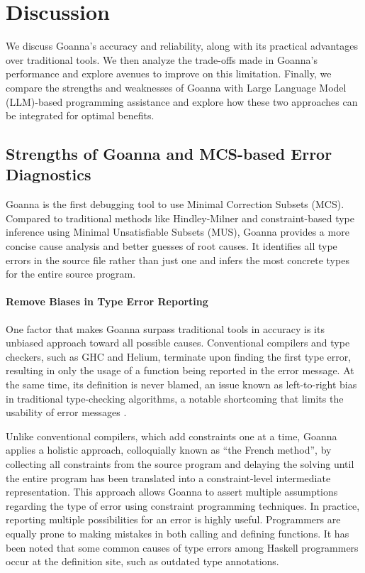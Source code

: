 \documentclass[pdflatex,lineno,sn-nature,Numbered]{sn-jnl}%
\begin{document}
\section{Discussion} \label{sec:discussion}

We discuss Goanna's accuracy and reliability, along with its practical advantages over traditional tools. We then analyze the trade-offs made in Goanna's performance and explore avenues to improve on this limitation. Finally, we compare the strengths and weaknesses of Goanna with Large Language Model (LLM)-based programming assistance and explore how these two approaches can be integrated for optimal benefits.

\subsection{Strengths of Goanna and MCS-based Error Diagnostics}

Goanna is the first debugging tool to use Minimal Correction Subsets (MCS). Compared to traditional methods like Hindley-Milner and constraint-based type inference using Minimal Unsatisfiable Subsets (MUS), Goanna provides a more concise cause analysis and better guesses of root causes. It identifies all type errors in the source file rather than just one and infers the most concrete types for the entire source program.

\paragraph{Remove Biases in Type Error Reporting}

One factor that makes Goanna surpass traditional tools in accuracy is its unbiased approach toward all possible causes. Conventional compilers and type checkers, such as GHC and Helium, terminate upon finding the first type error, resulting in only the usage of a function being reported in the error message. At the same time, its definition is never blamed, an issue known as left-to-right bias in traditional type-checking algorithms, a notable shortcoming that limits the usability of error messages \cite{McAdam2002-vb, Lee1998-fx, Chen2014-ev}. 

Unlike conventional compilers, which add constraints one at a time, Goanna applies a holistic approach, colloquially known as ``the French method'', by collecting all constraints from the source program and delaying the solving until the entire program has been translated into a constraint-level intermediate representation. This approach allows Goanna to assert multiple assumptions regarding the type of error using constraint programming techniques. In practice, reporting multiple possibilities for an error is highly useful. Programmers are equally prone to making mistakes in both calling and defining functions. It has been noted that some common causes of type errors among Haskell programmers occur at the definition site, such as outdated type annotations.
\end{document}

